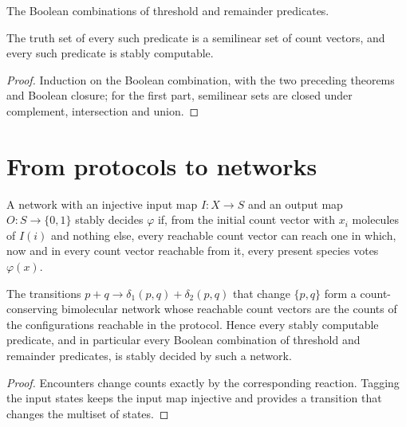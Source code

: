 \begin{definition}\label{def:semilinear}
\leanok{}
The Boolean combinations of threshold and remainder predicates.
\end{definition}

\begin{theorem}\label{thm:semilinear}
\leanok{}
The truth set of every such predicate is a semilinear set of count vectors, and every such
predicate is stably computable.
\end{theorem}
\begin{proof}\leanok
Induction on the Boolean combination, with the two preceding theorems and Boolean closure; for
the first part, semilinear sets are closed under complement, intersection and union.
\end{proof}

\section{From protocols to networks}
\begin{definition}\label{def:crn-stable}
\leanok{}
A network with an injective input map $I : X \to S$ and an output map $O : S \to \{0, 1\}$
stably decides $\varphi$ if, from the initial count vector with $x_i$ molecules of $I(i)$ and nothing
else, every reachable count vector can reach one in which, now and in every count vector reachable
from it, every present species votes $\varphi(x)$.
\end{definition}

\begin{theorem}\label{thm:transfer}
\leanok{}
The transitions $p + q \to \delta_1(p, q) + \delta_2(p, q)$ that change $\{p, q\}$ form a
count-conserving bimolecular network whose reachable count vectors are the counts of the
configurations reachable in the protocol. Hence every stably computable predicate, and in
particular every Boolean combination of threshold and remainder predicates, is stably decided by
such a network.
\end{theorem}
\begin{proof}\leanok
Encounters change counts exactly by the corresponding reaction. Tagging the input states keeps
the input map injective and provides a transition that changes the multiset of states.
\end{proof}

